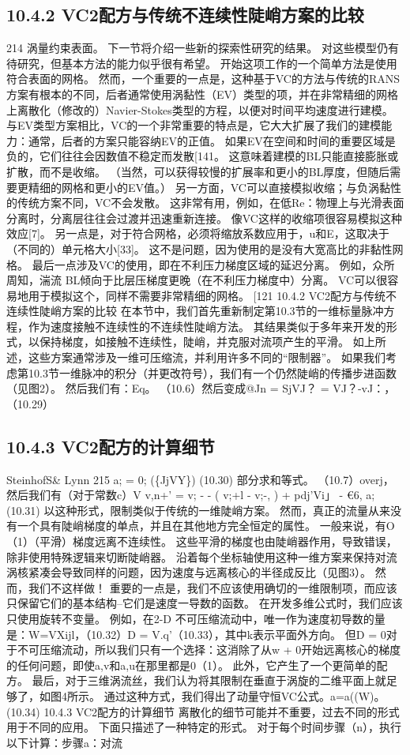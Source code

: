 \documentclass[UTF8,11pt,a4paper,openany,fontset=fandol]{ctexbook}
\begin{document}
\subsection{10.4.2 VC2配方与传统不连续性陡峭方案的比较}
214 涡量约束表面。 下一节将介绍一些新的探索性研究的结果。 对这些模型仍有待研究，但基本方法的能力似乎很有希望。 开始这项工作的一个简单方法是使用符合表面的网格。 然而，一个重要的一点是，这种基于VC的方法与传统的RANS方案有根本的不同，后者通常使用涡黏性（EV）类型的项，并在非常精细的网格上离散化（修改的）Navier-Stokes类型的方程，以便对时间平均速度进行建模。 与EV类型方案相比，VC的一个非常重要的特点是，它大大扩展了我们的建模能力：通常，后者的方案只能容纳EV的正值。 如果EV在空间和时间的重要区域是负的，它们往往会因数值不稳定而发散[141。 这意味着建模的BL只能直接膨胀或扩散，而不是收缩。 （当然，可以获得较慢的扩展率和更小的BL厚度，但随后需要更精细的网格和更小的EV值。） 另一方面，VC可以直接模拟收缩；与负涡黏性的传统方案不同，VC不会发散。 这非常有用，例如，在低Re：物理上与光滑表面分离时，分离层往往会过渡并迅速重新连接。 像VC这样的收缩项很容易模拟这种效应[7]。 另一点是，对于符合网格，必须将缩放系数应用于，u和E，这取决于（不同的）单元格大小[33]。 这不是问题，因为使用的是没有大宽高比的非黏性网格。 最后一点涉及VC的使用，即在不利压力梯度区域的延迟分离。 例如，众所周知，湍流 BL倾向于比层压梯度更晚（在不利压力梯度中）分离。 VC可以很容易地用于模拟这个，同样不需要非常精细的网格。 [121 10.4.2 VC2配方与传统不连续性陡峭方案的比较 在本节中，我们首先重新制定第10.3节的一维标量脉冲方程，作为速度接触不连续性的不连续性陡峭方法。 其结果类似于多年来开发的形式，以保持梯度，如接触不连续性，陡峭，并克服对流项产生的平滑。 如上所述，这些方案通常涉及一维可压缩流，并利用许多不同的“限制器”。 如果我们考虑第10.3节一维脉冲的积分（并更改符号），我们有一个仍然陡峭的传播步进函数（见图2）。 然后我们有：Eq。 （10.6）然后变成@Jn = SjVJ？ = VJ？-vJ：，（10.29）

\subsection{10.4.3 VC2配方的计算细节}
SteinhofS\& Lynn 215 a; = 0; (\{JjVY\}) (10.30) 部分求和等式。 （10.7）overj，然后我们有（对于常数c）V v,n+' = v; - - ( v;+l - v;-, ) + pdj'Vi」 - €6, a; (10.31) 以这种形式，限制类似于传统的一维陡峭方案。 然而，真正的流量从来没有一个具有陡峭梯度的单点，并且在其他地方完全恒定的属性。 一般来说，有O（1）（平滑）梯度远离不连续性。 这些平滑的梯度也由陡峭器作用，导致错误，除非使用特殊逻辑来切断陡峭器。 沿着每个坐标轴使用这种一维方案来保持对流涡核紧凑会导致同样的问题，因为速度与远离核心的半径成反比（见图3）。 然而，我们不这样做！ 重要的一点是，我们不应该使用确切的一维限制项，而应该只保留它们的基本结构--它们是速度一导数的函数。 在开发多维公式时，我们应该只使用旋转不变量。 例如，在2-D 不可压缩流动中，唯一作为速度初导数的量是：W=VXijl，（10.32）D = V.q'（10.33），其中k表示平面外方向。 但D = 0对于不可压缩流动，所以我们只有一个选择：这消除了从w + 0开始远离核心的梯度的任何问题，即使a,v和a,u在那里都是0（1）。 此外，它产生了一个更简单的配方。 最后，对于三维涡流丝，我们认为将其限制在垂直于涡旋的二维平面上就足够了，如图4所示。 通过这种方式，我们得出了动量守恒VC公式。a=a((W)。 (10.34) 10.4.3 VC2配方的计算细节 离散化的细节可能并不重要，过去不同的形式用于不同的应用。 下面只描述了一种特定的形式。 对于每个时间步骤（n），执行以下计算：步骤a：对流
\end{document}
